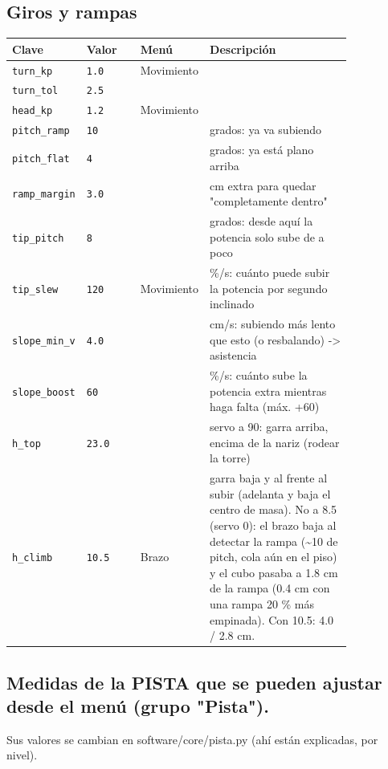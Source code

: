 \subsection*{Giros y rampas}
\begin{longtable}{@{}p{0.2\linewidth}p{0.17\linewidth}lp{0.47\linewidth}@{}}\toprule
\textbf{Clave} & \textbf{Valor} & \textbf{Men\'u} & \textbf{Descripci\'on} \\\midrule\endhead
\texttt{turn\_\allowbreak{}kp} & \texttt{1.0} & Movimiento &  \\
\texttt{turn\_\allowbreak{}tol} & \texttt{2.5} &  &  \\
\texttt{head\_\allowbreak{}kp} & \texttt{1.2} & Movimiento &  \\
\texttt{pitch\_\allowbreak{}ramp} & \texttt{10} &  & grados: ya va subiendo \\
\texttt{pitch\_\allowbreak{}flat} & \texttt{4} &  & grados: ya está plano arriba \\
\texttt{ramp\_\allowbreak{}margin} & \texttt{3.0} &  & cm extra para quedar "completamente dentro" \\
\texttt{tip\_\allowbreak{}pitch} & \texttt{8} &  & grados: desde aquí la potencia solo sube de a poco \\
\texttt{tip\_\allowbreak{}slew} & \texttt{120} & Movimiento & \%/s: cuánto puede subir la potencia por segundo inclinado \\
\texttt{slope\_\allowbreak{}min\_\allowbreak{}v} & \texttt{4.0} &  & cm/s: subiendo más lento que esto (o resbalando) -> asistencia \\
\texttt{slope\_\allowbreak{}boost} & \texttt{60} &  & \%/s: cuánto sube la potencia extra mientras haga falta (máx. +60) \\
\texttt{h\_\allowbreak{}top} & \texttt{23.0} &  & servo a 90\textdegree{}: garra arriba, encima de la nariz (rodear la torre) \\
\texttt{h\_\allowbreak{}climb} & \texttt{10.5} & Brazo & garra baja y al frente al subir (adelanta y baja el centro de masa). No a 8.5 (servo 0\textdegree{}): el brazo baja al detectar la rampa (\textasciitilde{}10\textdegree{} de pitch, cola aún en el piso) y el cubo pasaba a 1.8 cm de la rampa (0.4 cm con una rampa 20 \% más empinada). Con 10.5: 4.0 / 2.8 cm. \\
\bottomrule\end{longtable}
\subsection*{Medidas de la PISTA que se pueden ajustar desde el menú (grupo "Pista").}
Sus valores se cambian en software/core/pista.py (ahí están explicadas, por nivel).

